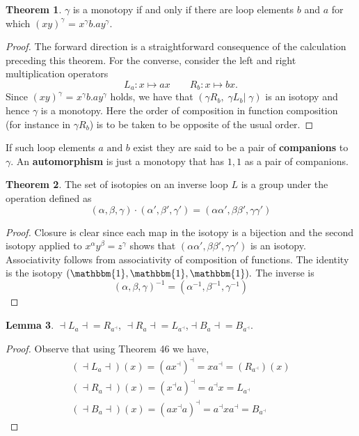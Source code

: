 \documentclass[11pt]{report}
\theoremstyle{plain}
\theoremstyle{definition}
\newtheorem{theorem}{Theorem}
\newtheorem{lemma}[theorem]{Lemma}
\begin{document}
\begin{theorem}
	$ \gamma $ is a monotopy if and only if there are loop elements  $ b $ and $ a $ for which $(xy)^\gamma$ = $ x^\gamma b.ay^\gamma. $
\end{theorem}
\begin{proof}
	The forward direction is a straightforward consequence of the calculation preceding this theorem. For the converse, consider the left and right multiplication operators 
	$$L_a : x \mapsto ax \qquad R_b : x \mapsto bx. $$ Since $(xy)^\gamma$ = $ x^\gamma b.ay^\gamma $ holds, we have that $ (\gamma R_b , \; \gamma L_b |\;  \gamma) $ is an isotopy and hence $ \gamma $ is a monotopy. Here the order of composition in function composition (for instance in $ \gamma R_b $) is to be taken to be opposite of the usual order.
\end{proof}
If such loop elements $ a \text{ and } b  $ exist they are said to be a pair of \textbf{companions} to $ \gamma $. An \textbf{automorphism} is just a monotopy that has $ 1,1 $ as a pair of companions.
\begin{theorem}
	The set of isotopies on an inverse loop $ L $ is a group under the operation defined as 
	$$ (\alpha , \beta, \gamma) \cdot (\alpha', \beta' , \gamma') = (\alpha\alpha', \beta\beta',\gamma\gamma') $$
\end{theorem}
\begin{proof}
Closure is clear since each map in the isotopy is a bijection and the second isotopy applied to $ x^\alpha y^\beta = z^\gamma $ shows that  $ (\alpha\alpha', \beta\beta',\gamma\gamma') $ is an isotopy. Associativity follows from associativity of composition of functions. The identity is the isotopy $ (\mathbbm{1}, \mathbbm{1},\mathbbm{1}). $ The inverse is
$$(\alpha, \beta, \gamma)^{-1} = (\alpha^{-1}, \beta^{-1},\gamma^{-1}) $$
\end{proof}
\begin{lemma}
	$ \dashv L_a \dashv = R_{a^\dashv} $, \qquad $ \dashv R_a \dashv = L_{a^\dashv}  $,\quad $ \dashv B_a \dashv = B_{a^\dashv} $.
\end{lemma}
\begin{proof}
	Observe that using Theorem 46 we have,
	\begin{align*}
	(\dashv L_a \dashv)(x) = (ax^\dashv)^\dashv = xa^\dashv = (R_{a^\dashv})(x)\\
	(\dashv R_a \dashv)(x) = (x^\dashv a)^\dashv = a^\dashv x = L_{a^\dashv}\\
	(\dashv B_a \dashv)(x) = (a x^\dashv a)^\dashv = a^\dashv x a^\dashv  = B_{a^\dashv}
	\end{align*}	
\end{proof}
\end{document}
